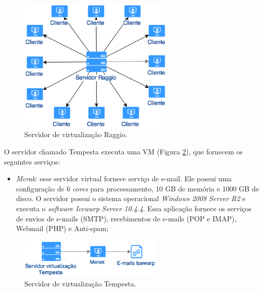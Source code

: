 \begin{figure}[h!]
 \centering
 \includegraphics[width=280px]{img/serv_raggio.eps}
 \caption{Servidor de virtualização Raggio.}
 \label{fig:serv_raggio}
\end{figure}

O servidor chamado Tempesta executa uma \ac{VM} (Figura \ref{fig:serv_tempesta}), que fornecem os seguintes serviços:
\begin{itemize}
  \item \textit{Merak}: esse servidor virtual fornece serviço de e-mail. Ele possui uma configuração de 6 \textit{cores} para processamento, 
 10 GB de memória e 1000 GB de disco. O servidor possui o sistema operacional \textit{Windows 2008 Server R2} e executa o \textit{software} 
 \textit{Icewarp Server 10.4.4}. Essa aplicação fornece os serviços de envios de e-mails (\ac{SMTP}), recebimentos de e-mails (\ac{POP} e 
 \ac{IMAP}), Webmail (\ac{PHP}) e Anti-spam;

\end{itemize}

\begin{figure}[h!]
 \centering
 \includegraphics[width=260px]{img/serv_tempesta.eps}
 \caption{Servidor de virtualização Tempesta.}
 \label{fig:serv_tempesta}
\end{figure}

